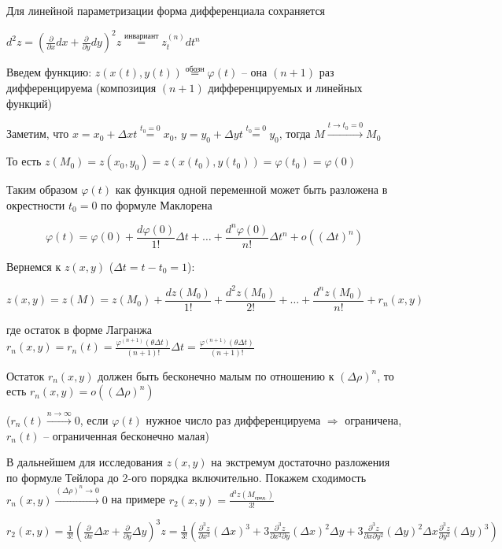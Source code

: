 \documentclass[12pt]{article}
\begin{document}
    Для линейной параметризации форма дифференциала сохраняется

    $d^2 z = \left(\frac{\partial }{\partial x}dx + \frac{\partial}{\partial y}dy\right)^2 z \stackrel{\text{инвариант}}{=} z^{(n)}_t dt^n$

    Введем функцию: $z(x(t), y(t)) \stackrel{\text{обозн}}{=} \varphi (t)$ -- она $(n + 1)$ раз дифференцируема (композиция $(n + 1)$ дифференцируемых и линейных функций)

    Заметим, что $x = x_0 + \Delta x t \stackrel{t_0 = 0}{=} x_0$, $y = y_0 + \Delta y t \stackrel{t_0 = 0}{=} y_0$, тогда $M \stackrel{t \to t_0 = 0}{\rightarrow} M_0$

    То есть $z(M_0) = z(x_0, y_0) = z(x(t_0), y(t_0)) = \varphi (t_0) = \varphi(0)$

    Таким образом $\varphi(t)$ как функция одной переменной может быть разложена в окрестности $t_0 = 0$ по формуле Маклорена

    \[\varphi(t) = \varphi(0) + \frac{d\varphi(0)}{1!} \Delta t + \dots + \frac{d^{n}\varphi(0)}{n!} \Delta t^n + o((\Delta t)^n)\]

    Вернемся к $z(x, y)$ ($\Delta t = t - t_0 = 1$):

    \[z(x, y) = z(M) = z(M_0) + \frac{dz(M_0)}{1!} + \frac{d^2 z(M_0)}{2!} + \dots + \frac{d^n z(M_0)}{n!} + r_n(x, y)\]

    где остаток в форме Лагранжа $r_n(x, y) = r_n(t) = \frac{\varphi^{(n+1)}(\theta \Delta t)}{(n + 1)!} \Delta t = \frac{\varphi^{(n+1)}(\theta \Delta t)}{(n + 1)!}$

    Остаток $r_n(x, y)$ должен быть бесконечно малым по отношению к $(\Delta \rho)^n$, то есть $r_n(x, y) = o((\Delta \rho)^n)$

    ($r_n(t) \stackrel{n \to \infty}{\rightarrow} 0$, если $\varphi(t)$ нужное число раз дифференцируема $\Rightarrow$ ограничена, $r_n(t)$ -- ограниченная бесконечно малая)

    \Nota В дальнейшем для исследования $z(x, y)$ на экстремум достаточно разложения по формуле Тейлора до 2-ого порядка включительно.
    Покажем сходимость $r_n(x, y) \stackrel{(\Delta \rho)^n \to 0}{\rightarrow} 0$ на примере $\displaystyle r_2 (x, y) = \frac{d^3 z(M_{\text{сред.}})}{3!}$


    $r_2(x, y) = \frac{1}{3!} \left(\frac{\partial}{\partial x} \Delta x + \frac{\partial}{\partial y} \Delta y\right)^3 z =
    \frac{1}{3!} \left(\frac{\partial^3 z}{\partial x^3} (\Delta x)^3 + 3 \frac{\partial^3 z}{\partial x^2 \partial y} (\Delta x)^2 \Delta y +
    3 \frac{\partial^3 z}{\partial x \partial y^2} (\Delta y)^2 \Delta x \frac{\partial^3 z}{\partial y^3} (\Delta y)^3\right)$
\end{document}
